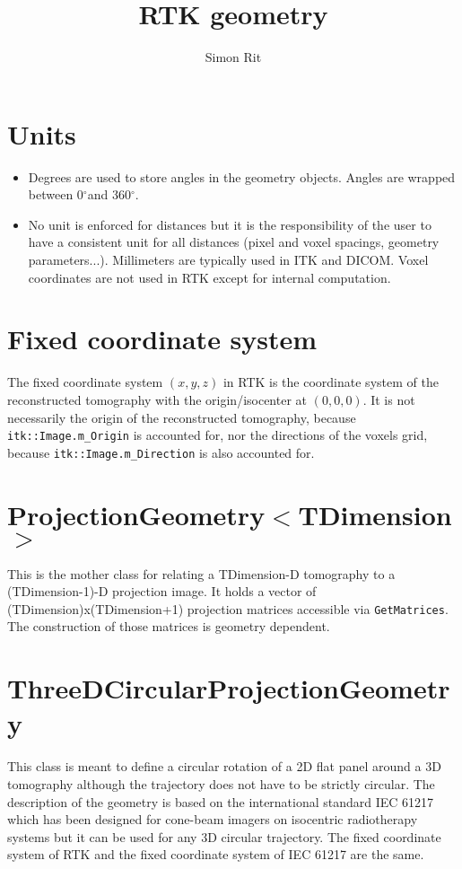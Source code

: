 \documentclass{article}
\newcommand{\degree}{\ensuremath{^\circ}}
\begin{document}
\title{RTK geometry}
\author{Simon Rit}

\maketitle

\section{Units}

\begin{itemize}
 \item Degrees are used to store angles in the geometry objects. Angles are wrapped between 0\degree and 360\degree.
 \item No unit is enforced for distances but it is the responsibility of the user to have a consistent unit for all distances (pixel and voxel spacings, geometry parameters...). Millimeters are typically used in ITK and DICOM. Voxel coordinates are not used in RTK except for internal computation.
\end{itemize}

\section{Fixed coordinate system}

The fixed coordinate system $(x,y,z)$ in RTK is the coordinate system of the reconstructed tomography with the origin/isocenter at $(0,0,0)$. It is not necessarily the origin of the reconstructed tomography, because \verb+itk::Image.m_Origin+ is accounted for, nor the directions of the voxels grid, because \verb+itk::Image.m_Direction+ is also accounted for.

\section{ProjectionGeometry$<$TDimension$>$}

This is the mother class for relating a TDimension-D tomography to a (TDimension-1)-D projection image. It holds a vector of (TDimension)x(TDimension+1) projection matrices accessible via \verb+GetMatrices+. The construction of those matrices is geometry dependent.

\section{ThreeDCircularProjectionGeometry}

This class is meant to define a circular rotation of a 2D flat panel around a 3D tomography although the trajectory does not have to be strictly circular. The description of the geometry is based on the international standard IEC 61217 which has been designed for cone-beam imagers on isocentric radiotherapy systems but it can be used for any 3D circular trajectory. The fixed coordinate system of RTK and the fixed coordinate system of IEC 61217 are the same.
\end{document}

